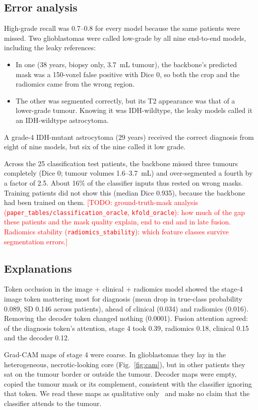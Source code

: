 \documentclass[11pt]{article}
\newcommand{\todo}[1]{\textcolor{red}{[TODO: #1]}}
\begin{document}
\subsection{Error analysis}
High-grade recall was 0.7--0.8 for every model because the same patients were missed. Two glioblastomas were called
low-grade by all nine end-to-end models, including the leaky references:
\begin{itemize}
  \item In one (38 years, biopsy only, 3.7~mL tumour), the backbone's predicted mask was a 150-voxel false positive with
        Dice 0, so both the crop and the radiomics came from the wrong region.
  \item The other was segmented correctly, but its T2 appearance was that of a lower-grade tumour. Knowing it was
        IDH-wildtype, the leaky models called it an IDH-wildtype astrocytoma.
\end{itemize}
A grade-4 IDH-mutant astrocytoma (29 years) received the correct diagnosis from eight of nine models, but six of the
nine called it low grade.

Across the 25 classification test patients, the backbone missed three tumours completely (Dice 0; tumour volumes
1.6--3.7~mL) and over-segmented a fourth by a factor of 2.5. About 16\% of the classifier inputs thus rested on wrong
masks. Training patients did not show this (median Dice 0.935), because the backbone had been trained on them.
\todo{ground-truth-mask analysis (\texttt{paper\_tables/classification\_oracle}, \texttt{kfold\_oracle}): how much
of the gap these patients and the mask quality explain, end to end and in late fusion. Radiomics stability
(\texttt{radiomics\_stability}): which feature classes survive segmentation errors.}

\subsection{Explanations}
Token occlusion in the image + clinical + radiomics model showed the stage-4 image token mattering most for diagnosis
(mean drop in true-class probability 0.089, SD 0.146 across patients), ahead of clinical (0.034) and radiomics
(0.016). Removing the decoder token changed nothing (0.0001). Fusion attention agreed: of the diagnosis token's
attention, stage 4 took 0.39, radiomics 0.18, clinical 0.15 and the decoder 0.12.

Grad-CAM maps of stage 4 were coarse. In glioblastomas they lay in the heterogeneous, necrotic-looking core
(Fig.~\ref{fig:cam}), but in other patients they sat on the tumour border or outside the tumour. Decoder maps were
empty, copied the tumour mask or its complement, consistent with the classifier ignoring that token. We read these
maps as qualitative only~\cite{adebayo2018sanity} and make no claim that the classifier attends to the tumour.
\end{document}
